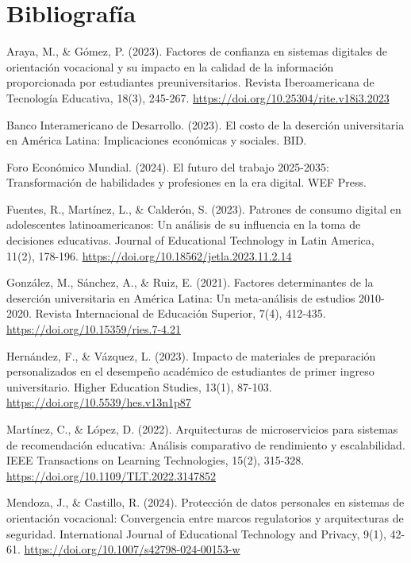 \section{Bibliografía}
Araya, M., \& Gómez, P. (2023). Factores de confianza en sistemas digitales de orientación vocacional y su impacto en la calidad de la información proporcionada por estudiantes preuniversitarios. Revista Iberoamericana de Tecnología Educativa, 18(3), 245-267. \url{https://doi.org/10.25304/rite.v18i3.2023}
\newline

Banco Interamericano de Desarrollo. (2023). El costo de la deserción universitaria en América Latina: Implicaciones económicas y sociales. BID.
\newline

Foro Económico Mundial. (2024). El futuro del trabajo 2025-2035: Transformación de habilidades y profesiones en la era digital. WEF Press.
\newline

Fuentes, R., Martínez, L., \& Calderón, S. (2023). Patrones de consumo digital en adolescentes latinoamericanos: Un análisis de su influencia en la toma de decisiones educativas. Journal of Educational Technology in Latin America, 11(2), 178-196. \url{https://doi.org/10.18562/jetla.2023.11.2.14}
\newline

González, M., Sánchez, A., \& Ruiz, E. (2021). Factores determinantes de la deserción universitaria en América Latina: Un meta-análisis de estudios 2010-2020. Revista Internacional de Educación Superior, 7(4), 412-435. \url{https://doi.org/10.15359/ries.7-4.21}
\newline

Hernández, F., \& Vázquez, L. (2023). Impacto de materiales de preparación personalizados en el desempeño académico de estudiantes de primer ingreso universitario. Higher Education Studies, 13(1), 87-103. \url{https://doi.org/10.5539/hes.v13n1p87}
\newline

Martínez, C., \& López, D. (2022). Arquitecturas de microservicios para sistemas de recomendación educativa: Análisis comparativo de rendimiento y escalabilidad. IEEE Transactions on Learning Technologies, 15(2), 315-328. \url{https://doi.org/10.1109/TLT.2022.3147852}
\newline

Mendoza, J., \& Castillo, R. (2024). Protección de datos personales en sistemas de orientación vocacional: Convergencia entre marcos regulatorios y arquitecturas de seguridad. International Journal of Educational Technology and Privacy, 9(1), 42-61. \url{https://doi.org/10.1007/s42798-024-00153-w}
\newline

